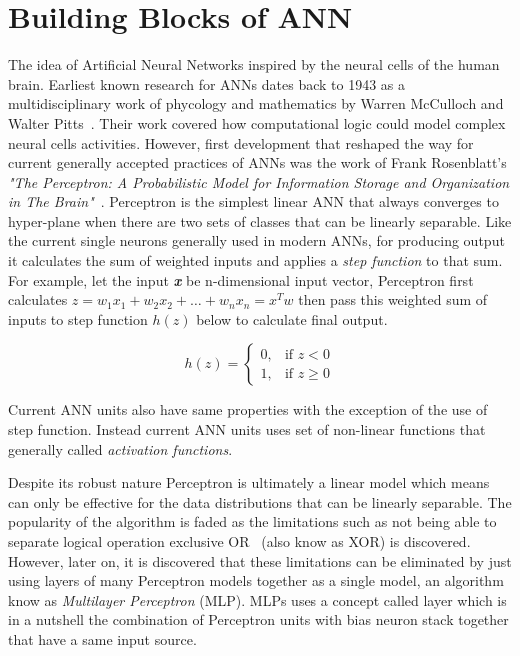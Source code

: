 \section{Building Blocks of ANN}
The idea of Artificial Neural Networks inspired by the neural cells of the human brain. Earliest known research for ANNs dates back to 1943 as a multidisciplinary work of phycology and mathematics by Warren McCulloch and Walter Pitts~\cite{firstann}. Their work covered how computational logic could model complex neural cells activities. However, first development that reshaped the way for current generally accepted practices of ANNs was the work of Frank Rosenblatt's  \emph{"The Perceptron: A Probabilistic Model for Information Storage and Organization in The Brain"}~\cite{perceptron}. Perceptron is the simplest linear ANN that always converges to hyper-plane when there are two sets of classes that can be linearly separable. Like the current single neurons generally used in modern ANNs, for producing output it calculates the sum of weighted inputs and applies a \emph{step function} to that sum. For example, let the input \textbf{\textit{x}} be n-dimensional input vector, Perceptron first calculates \(z = w_1x_1 + w_2x_2 + \ldots + w_nx_n = x^Tw\) then pass this weighted sum of inputs to step function \(h(z)\) below to calculate final output. 

\begin{equation} \label{eq:stepfunc21}
h(z)=
\begin{cases}
    0, & \text{if } z< 0\\
    1, & \text{if } z\geq 0
\end{cases}    
\end{equation}

Current ANN units also have same properties with the exception of the use of step function. Instead current ANN units uses set of non-linear functions that generally called \emph{activation functions}. 

Despite its robust nature Perceptron is ultimately a linear model which means can only be effective for the data distributions that can be linearly separable. The popularity of the algorithm is faded as the limitations such as not being able to separate logical operation exclusive OR~\cite{marvinperceptrons} (also know as XOR) is discovered.
However, later on, it is discovered that these limitations can be eliminated by just using layers of many Perceptron models together as a single model, an algorithm know as \emph{Multilayer Perceptron} (MLP). MLPs uses a concept called layer which is in a nutshell the combination of Perceptron units with bias neuron stack together that have a same input source. 


